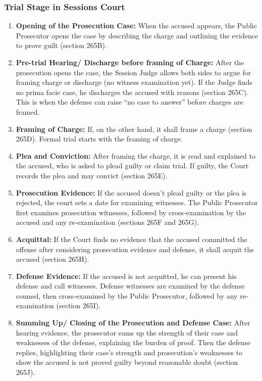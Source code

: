 \subsubsection{Trial Stage in Sessions Court}

\begin{enumerate}[label=$({\roman*})$, itemsep=1em]
   \item \textbf{Opening of the Prosecution Case:}
   When the accused appears, the Public Prosecutor opens the case by describing the charge and outlining the evidence to prove guilt (section 265B).
   
   \item \textbf{Pre-trial Hearing/ Discharge before framing of Charge:}
   After the prosecution opens the case, the Session Judge allows both sides to argue for framing charge or discharge (no witness examination yet). If the Judge finds no prima facie case, he discharges the accused with reasons (section 265C). This is when the defense can raise “no case to answer” before charges are framed.
   
   \item \textbf{Framing of Charge:}
   If, on the other hand, it shall frame a charge (section 265D). Formal trial starts with the framing of charge.
   
   \item \textbf{Plea and Conviction:}
   After framing the charge, it is read and explained to the accused, who is asked to plead guilty or claim trial. If guilty, the Court records the plea and may convict (section 265E).
   
   \item \textbf{Prosecution Evidence:}
   If the accused doesn't plead guilty or the plea is rejected, the court sets a date for examining witnesses. The Public Prosecutor first examines prosecution witnesses, followed by cross-examination by the accused and any re-examination (sections 265F and 265G).
   
   \item \textbf{Acquittal:}
   If the Court finds no evidence that the accused committed the offense after considering prosecution evidence and defense, it shall acquit the accused (section 265H).
   
   \pagebreak
   \item \textbf{Defense Evidence:}
   If the accused is not acquitted, he can present his defense and call witnesses. Defense witnesses are examined by the defense counsel, then cross-examined by the Public Prosecutor, followed by any re-examination (section 265I).
   
   \item \textbf{Summing Up/ Closing of the Prosecution and Defense Case:}
   After hearing evidence, the prosecutor sums up the strength of their case and weaknesses of the defense, explaining the burden of proof. Then the defense replies, highlighting their case's strength and prosecution's weaknesses to show the accused is not proved guilty beyond reasonable doubt (section 265J).
\end{enumerate}


